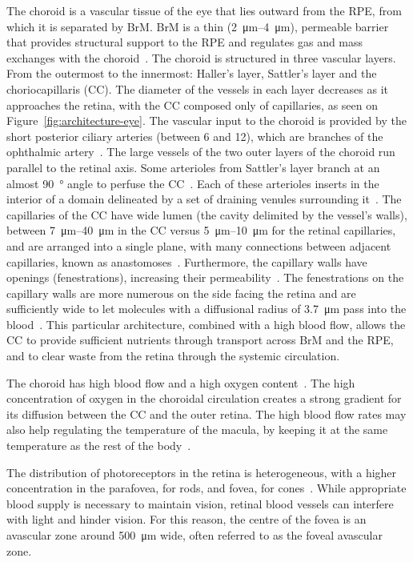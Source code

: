 \documentclass{article}
\begin{document}
The choroid is a vascular tissue of the eye that lies outward from the RPE, from which it is separated by BrM.
BrM is a thin (\SIrange{2}{4}{\micro\meter}), permeable barrier that provides structural support to the RPE and regulates gas and mass exchanges with the choroid~\cite{Curcio_2013}.
The choroid is structured in three vascular layers.
From the outermost to the innermost: Haller's layer, Sattler's layer and the choriocapillaris (CC).
The diameter of the vessels in each layer decreases as it approaches the retina, with the CC composed only of capillaries, as seen on Figure~\ref{fig:architecture-eye}.
The vascular input to the choroid is provided by the short posterior ciliary arteries (between 6 and 12), which are branches of the ophthalmic artery~\cite{Kiel_2011}.
The large vessels of the two outer layers of the choroid run parallel to the retinal axis.
Some arterioles from Sattler's layer branch at an almost \SI{90}{\degree} angle to perfuse the CC~\cite{Nickla_2010}.
Each of these arterioles inserts in the interior of a domain delineated by a set of draining venules surrounding it~\cite{Zouache_2016}.
The capillaries of the CC have wide lumen (the cavity delimited by the vessel's walls), between \SIrange{7}{40}{\micro\meter} in the CC versus \SIrange{5}{10}{\micro\meter} for the retinal capillaries, and are arranged into a single plane, with many connections between adjacent capillaries, known as anastomoses~\cite{Bill_1983, ChanLing_2011,Fryczkowski_1994}.
Furthermore, the capillary walls have openings (fenestrations), increasing their permeability~\cite{Nickla_2010}.
The fenestrations on the capillary walls are more numerous on the side facing the retina and are sufficiently wide to let molecules with a diffusional radius of \SI{3.7}{\micro\meter} pass into the blood~\cite{Bill_1983,Nickla_2010}.
This particular architecture, combined with a high blood flow, allows the CC to provide sufficient nutrients through transport across BrM and the RPE, and to clear waste from the retina through the systemic circulation.

The choroid has high blood flow and a high oxygen content~\cite{Bill_1983}.
The high concentration of oxygen in the choroidal circulation creates a strong gradient for its diffusion between the CC and the outer retina.
The high blood flow rates may also help regulating the temperature of the macula, by keeping it at the same temperature as the rest of the body~\cite{Bill_1983, Parver_1991}.

The distribution of photoreceptors in the retina is heterogeneous, with a higher concentration in the parafovea, for rods, and fovea, for cones~\cite{Zouache_2022}.
While appropriate blood supply is necessary to maintain vision, retinal blood vessels can interfere with light and hinder vision.
For this reason, the centre of the fovea is an avascular zone around \SI{500}{\micro\meter} wide, often referred to as the foveal avascular zone.%
\end{document}
